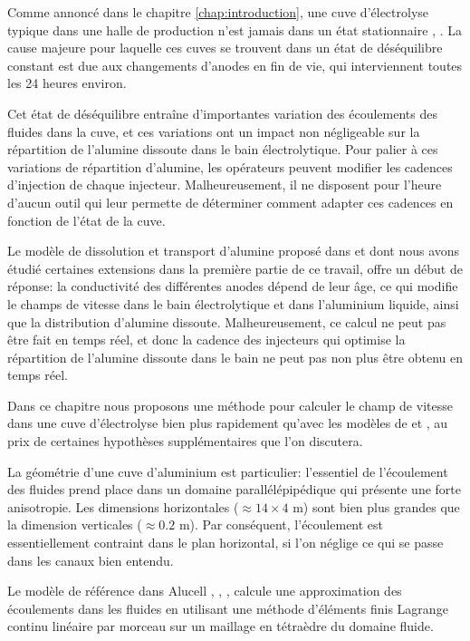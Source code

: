 Comme annoncé dans le chapitre \ref{chap:introduction}, une cuve
d'électrolyse typique dans une halle de production n'est jamais dans
un état stationnaire \cite{Steiner2009}, \cite{Flotron2013}. La cause
majeure pour laquelle ces cuves se trouvent dans un état de
déséquilibre constant est due aux changements d'anodes en fin de vie,
qui interviennent toutes les 24 heures environ.

Cet état de déséquilibre entraîne d'importantes variation des
écoulements des fluides dans la cuve, et ces variations ont un impact
non négligeable sur la répartition de l'alumine dissoute dans le bain
électrolytique. Pour palier à ces variations de répartition d'alumine,
les opérateurs peuvent modifier les cadences d'injection de chaque
injecteur. Malheureusement, il ne disposent pour l'heure d'aucun outil
qui leur permette de déterminer comment adapter ces cadences en
fonction de l'état de la cuve.

Le modèle de dissolution et transport d'alumine proposé dans
\cite{Hofer2011} et dont nous avons étudié certaines extensions dans
la première partie de ce travail, offre un début de réponse: la
conductivité des différentes anodes dépend de leur âge, ce qui modifie
le champs de vitesse dans le bain électrolytique et dans l'aluminium
liquide, ainsi que la distribution d'alumine
dissoute. Malheureusement, ce calcul ne peut pas être fait en temps
réel, et donc la cadence des injecteurs qui optimise la répartition de
l'alumine dissoute dans le bain ne peut pas non plus être obtenu en
temps réel.

Dans ce chapitre nous proposons une méthode pour calculer le champ de
vitesse dans une cuve d'électrolyse bien plus rapidement qu'avec les
modèles de \cite{Steiner2009} et \cite{Hofer2011}, au prix de
certaines hypothèses supplémentaires que l'on discutera.

La géométrie d'une cuve d'aluminium est particulier: l'essentiel de
l'écoulement des fluides prend place dans un domaine
parallélépipédique qui présente une forte anisotropie. Les dimensions
horizontales ($\approx \num{14}\times\num{4}$ \si{\meter}) sont bien plus
grandes que la dimension verticales ($\approx \num{0.2}$ \si{\meter}). Par
conséquent, l'écoulement est essentiellement contraint dans le plan
horizontal, si l'on néglige ce qui se passe dans les canaux bien
entendu.

Le modèle de référence dans Alucell \cite{Steiner2009},
\cite{Flotron2013}, \cite{Hofer2011}, \cite{Rochat2016} calcule une
approximation des écoulements dans les fluides en utilisant une
méthode d'éléments finis Lagrange continu linéaire par morceau sur un
maillage en tétraèdre du domaine fluide.

